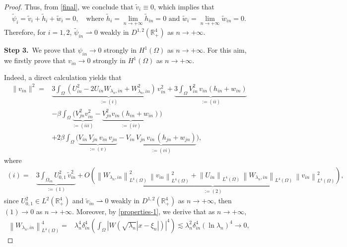 \documentclass[a4paper,reqno,11pt,oneside]{amsart}
\numberwithin{equation}{section}
\newcommand{\R}{\mathbb{R}}
\begin{document}
\begin{proof}
Thus, from \eqref{final}, we conclude that $ \widetilde{v}_i\equiv 0$, which implies that 
\begin{align*}
    \widetilde{\psi}_i=\widetilde{v}_i+\widetilde{h}_i+\widetilde{w}_i=0,\quad\text{where $\widetilde{h}_i=\lim_{n\to+\infty}\widetilde{h}_{in}=0$ and $\widetilde{w}_i=\lim_{n\to+\infty}\widetilde{w}_{in}=0$.} 
\end{align*}
Therefore, for $i=1,2$, \( \widetilde{\psi}_{in}\rightharpoonup 0 \) weakly in \(D^{1,2}(\R^4_{+})\) as $n \rightarrow+\infty$.

{\textbf{Step 3.}~We prove that \( {\psi}_{in}\to 0 \) strongly in \(H^{1}(\Omega)\) as $n \rightarrow+\infty$}. For this aim, we firstly prove that  \( {v}_{in}\to 0 \) strongly in \(H^{1}(\Omega)\) as $n \rightarrow+\infty$.  

Indeed, a direct calculation yields that
\begin{align*}
    \|v_{in}\|^2=&\underbrace{3\displaystyle\int_{ \Omega} \left(U_{in}^2-2U_{in}W_{\lambda_n,in}+W_{\lambda_n,in}^2\right)\,v_{in}^2}_{:=(i)}+\underbrace{3\displaystyle\int_{ \Omega} V_{in}^2\,v_{in}(h_{in}+w_{in})}_{:=(ii)}\\
    &-\beta\displaystyle\int_{ \Omega} \underbrace{\big(V_{jn}^2v_{in}^2}_{:=(iii)}-\underbrace{V_{jn}^2v_{in}\left(h_{in}+w_{in}\right)}_{:=(iv)}\big)\\
    &+2\beta\displaystyle\int_{ \Omega} \big(\underbrace{V_{in}\,V_{jn}\,v_{in}\,v_{jn}}_{:=(v)}-\underbrace{V_{in}\,V_{jn}\,v_{in}\,(h_{jn}+w_{jn})}_{:=(vi)}\big),
\end{align*}
where
\begin{align*}
    (i)
    =&\underbrace{3\displaystyle\int_{ \Omega_{in}} U_{0,1}^2\,\widetilde{v}_{{in}}^2}_{:=(1)}+\underbrace{O\left(\left\|W_{\lambda_n,in}\right\|_{L^4(\Omega)}^2\,\left\|v_{in}\right\|_{L^4(\Omega)}^2+\left\|U_{in}\right\|_{L^4(\Omega)}\,\left\|W_{\lambda_n,in}\right\|_{L^4(\Omega)}\,\left\|v_{in}\right\|_{L^4(\Omega)}^2\right)}_{:=(2)},
\end{align*}
since $U_{0,1}^2\in L^{2}(\R^4_{+})$ and \( \widetilde{v}_{in}\rightharpoonup 0 \) weakly in \(D^{1,2}(\R^4_{+})\) as $n \rightarrow+\infty$, then $(1)\to 0$ as $n \rightarrow+\infty$. Moreover, by \eqref{properties-1}, we derive that as $n \rightarrow+\infty$,
\begin{align}\label{W-N}
\left\|W_{\lambda_n,in}\right\|_{L^4(\Omega)}^4=&\lambda_n^4\delta_{in}^4\left(\displaystyle\int_{ \Omega}\left|W\left(\sqrt{\lambda_n}|x-\xi_n|\right)\right|^4\right)
\lesssim\lambda^2_{n}\delta_{in}^4\left(\ln{\lambda_n}\right)^4\to 0,

\end{align}
\end{proof}
\end{document}
